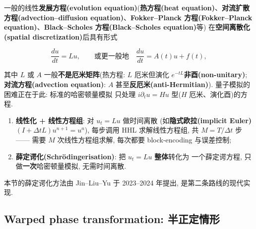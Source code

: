 \documentclass[utf8]{article} %
\numberwithin{equation}{section}   %
\newtheorem{Note}{\hskip 2em {\color{red} 注}}[subsection]
\begin{document}
一般的线性\textbf{发展方程(evolution equation)}(\textbf{热方程(heat equation)}、\textbf{对流扩散方程(advection--diffusion equation)}、\textbf{Fokker--Planck 方程(Fokker--Planck equation)}、\textbf{Black--Scholes 方程(Black--Scholes equation)}等)
在\textbf{空间离散化(spatial discretization)}后具有形式

\begin{equation}
    \frac{du}{dt} = L u, \qquad \text{或更一般地} \quad
    \frac{du}{dt} = A(t) u + f(t),
\end{equation}

其中 $L$ 或 $A$ 一般\textbf{不是厄米矩阵}(热方程: $L$ 厄米但演化 $e^{-tL}$\textbf{非酉(non-unitary)};
\textbf{对流方程(advection equation)}: $A$ 甚至\textbf{反厄米(anti-Hermitian)}). 量子模拟的困难正在于此: 标准的哈密顿量模拟
只处理 $i\partial_t u = Hu$ 型($H$ 厄米、演化酉)的方程.

\begin{Note}[两条历史路线]
    \begin{enumerate}
        \item \textbf{线性化 + 线性方程组}: 对 $u_t = Lu$ 做时间离散
        (如\textbf{隐式欧拉(implicit Euler)} $(I + \Delta t L)u^{n+1} = u^n$), 每步调用 HHL 求解线性方程组,
        共 $M = T/\Delta t$ 步 —— 需要 $M$ 次线性方程组求解, 每次都要
        block-encoding 与误差控制;
        \item \textbf{薛定谔化(Schrödingerisation)}: 把 $u_t = Lu$ \textbf{整体}转化为
        一个薛定谔方程, 只做\textbf{一次}哈密顿量模拟, 无需时间离散.
    \end{enumerate}
    本节的薛定谔化方法由 Jin--Liu--Yu 于 2023--2024 年提出, 是第二条路线的现代实现.
\end{Note}

\subsection{Warped phase transformation: 半正定情形}
\end{document}
